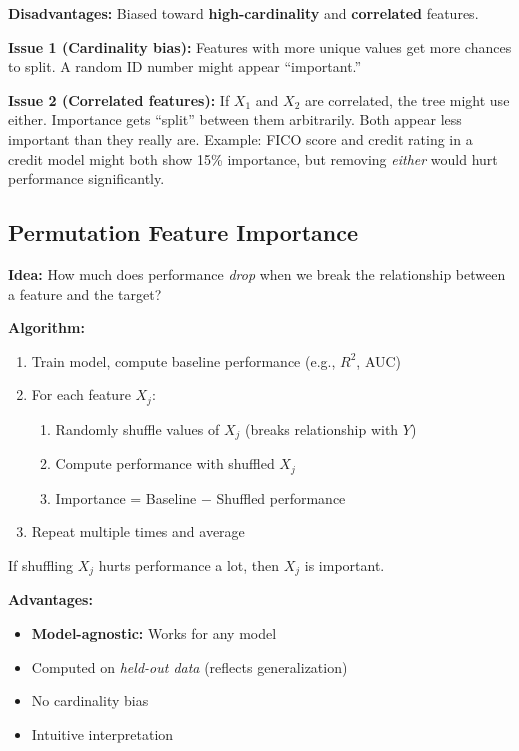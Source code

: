 \documentclass[11pt,a4paper]{article}
\newcommand{\keyword}[1]{\textbf{\textcolor{AccentOrange}{#1}}}
\begin{document}
\textbf{Disadvantages:} Biased toward \keyword{high-cardinality} and \keyword{correlated} features.

\textbf{Issue 1 (Cardinality bias):} Features with more unique values get more chances to split. A random ID number might appear ``important.''

\textbf{Issue 2 (Correlated features):} If $X_1$ and $X_2$ are correlated, the tree might use either. Importance gets ``split'' between them arbitrarily. Both appear less important than they really are. Example: FICO score and credit rating in a credit model might both show 15\% importance, but removing \emph{either} would hurt performance significantly.

\subsection{Permutation Feature Importance}

\textbf{Idea:} How much does performance \emph{drop} when we break the relationship between a feature and the target?

\textbf{Algorithm:}
\begin{enumerate}
    \item Train model, compute baseline performance (e.g., $R^2$, AUC)
    \item For each feature $X_j$:
    \begin{enumerate}
        \item Randomly shuffle values of $X_j$ (breaks relationship with $Y$)
        \item Compute performance with shuffled $X_j$
        \item Importance = Baseline $-$ Shuffled performance
    \end{enumerate}
    \item Repeat multiple times and average
\end{enumerate}

If shuffling $X_j$ hurts performance a lot, then $X_j$ is important.

\textbf{Advantages:}
\begin{itemize}
    \item \keyword{Model-agnostic:} Works for any model
    \item Computed on \emph{held-out data} (reflects generalization)
    \item No cardinality bias
    \item Intuitive interpretation
\end{itemize}
\end{document}
